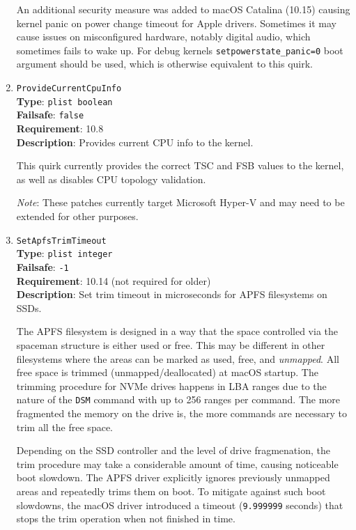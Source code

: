 \documentclass[]{article}
\begin{document}
\begin{enumerate}
  An additional security measure was added to macOS Catalina (10.15) causing
  kernel panic on power change timeout for Apple drivers. Sometimes it may cause
  issues on misconfigured hardware, notably digital audio, which sometimes fails
  to wake up. For debug kernels \texttt{setpowerstate\_panic=0} boot argument
  should be used, which is otherwise equivalent to this quirk.

\item
  \texttt{ProvideCurrentCpuInfo}\\
  \textbf{Type}: \texttt{plist\ boolean}\\
  \textbf{Failsafe}: \texttt{false}\\
  \textbf{Requirement}: 10.8\\
  \textbf{Description}: Provides current CPU info to the kernel.

  This quirk currently provides the correct TSC and FSB values to the kernel, as well
  as disables CPU topology validation.

  \emph{Note}: These patches currently target Microsoft Hyper-V and may need to be extended for
  other purposes.

\item
  \texttt{SetApfsTrimTimeout}\\
  \textbf{Type}: \texttt{plist\ integer}\\
  \textbf{Failsafe}: \texttt{-1}\\
  \textbf{Requirement}: 10.14 (not required for older)\\
  \textbf{Description}: Set trim timeout in microseconds for APFS filesystems on SSDs.

  The APFS filesystem is designed in a way that the space controlled via
  the spaceman structure is either used or free. This may be different in
  other filesystems where the areas can be marked as used, free, and
  \emph{unmapped}. All free space is trimmed (unmapped/deallocated)
  at macOS startup. The trimming procedure for NVMe drives happens
  in LBA ranges due to the nature of the \texttt{DSM} command with
  up to 256 ranges per command. The more fragmented the memory
  on the drive is, the more commands are necessary to trim
  all the free space.

  Depending on the SSD controller and the level of drive fragmenation, the trim
  procedure may take a considerable amount of time, causing noticeable boot slowdown.
  The APFS driver explicitly ignores previously unmapped areas and repeatedly trims
  them on boot. To mitigate against such boot slowdowns, the macOS driver introduced a
  timeout (\texttt{9.999999} seconds) that stops the trim operation when not finished in
  time.


\end{enumerate}
\end{document}
